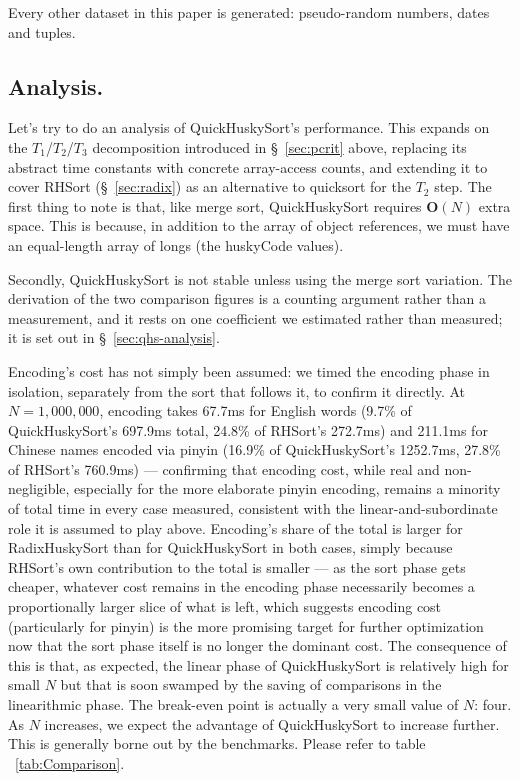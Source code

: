\documentclass[twoside,leqno,twocolumn]{article}
\begin{document}
Every other dataset in this paper is generated: pseudo-random numbers, dates and tuples.



\subsection{Analysis.}
\label{sec:analysis}
Let’s try to do an analysis of QuickHuskySort's performance.
This expands on the $T_1$/$T_2$/$T_3$ decomposition introduced in \S~\ref{sec:pcrit} above,
replacing its abstract time constants with concrete array-access counts,
and extending it to cover RHSort (\S~\ref{sec:radix}) as an alternative to quicksort for the $T_2$ step.
The first thing to note is that, like merge sort, QuickHuskySort requires $\textbf{O}(N)$ extra space.
This is because, in addition to the array of object references, we must have an equal-length array of longs (the huskyCode values).

Secondly, QuickHuskySort is not stable unless using the merge sort variation.
The derivation of the two comparison figures is a counting argument rather than a measurement, and it
rests on one coefficient we estimated rather than measured; it is set out in \S~\ref{sec:qhs-analysis}.

Encoding's cost has not simply been assumed:
we timed the encoding phase in isolation,
separately from the sort that follows it, to confirm it directly.
At $N = 1{,}000{,}000$, encoding takes 67.7ms for English words (9.7\% of QuickHuskySort's 697.9ms total,
24.8\% of RHSort's 272.7ms) and 211.1ms for Chinese names encoded via pinyin (16.9\% of QuickHuskySort's
1252.7ms, 27.8\% of RHSort's 760.9ms) — confirming that encoding cost, while real and non-negligible,
especially for the more elaborate pinyin encoding, remains a minority of total time in every case measured,
consistent with the linear-and-subordinate role it is assumed to play above.
Encoding's share of the total is larger for RadixHuskySort than for QuickHuskySort in both cases,
simply because RHSort's own contribution to the total is smaller —
as the sort phase gets cheaper,
whatever cost remains in the encoding phase necessarily becomes a proportionally larger slice of what is left,
which suggests encoding cost (particularly for pinyin)
is the more promising target for further optimization now that the sort phase itself is no longer the dominant cost.
The consequence of this is that, as expected,
the linear phase of QuickHuskySort is relatively high for small $N$ but that is soon swamped by the saving of comparisons in the linearithmic phase.
The break-even point is actually a very small value of $N$:
four.
As $N$ increases, we expect the advantage of QuickHuskySort to increase further.
This is generally borne out by the benchmarks.
Please refer to table ~\ref{tab:Comparison}.
\end{document}

